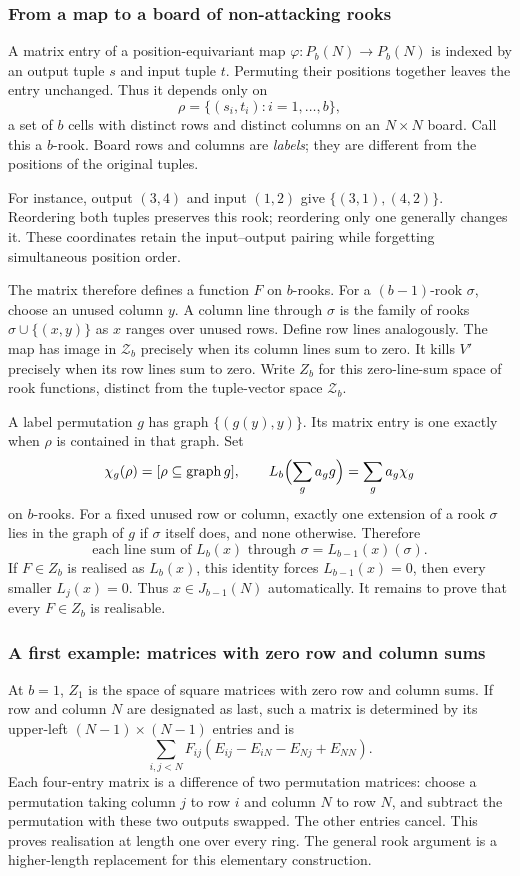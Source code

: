 \documentclass[11pt,a4paper]{article}
\theoremstyle{definition}\newtheorem{definition}[theorem]{Definition}
\theoremstyle{remark}\newtheorem{remark}[theorem]{Remark}
\begin{document}
\subsubsection{From a map to a board of non-attacking rooks}
A matrix entry of a position-equivariant map $\varphi:P_b(N)\to P_b(N)$ is indexed by an output tuple $s$ and input tuple $t$. Permuting their positions together leaves the entry unchanged. Thus it depends only on
\[\rho=\{(s_i,t_i):i=1,\ldots,b\},
\]
a set of $b$ cells with distinct rows and distinct columns on an $N\times N$ board. Call this a $b$-rook. Board rows and columns are \emph{labels}; they are different from the positions of the original tuples.

For instance, output $(3,4)$ and input $(1,2)$ give
$\{(3,1),(4,2)\}$. Reordering both tuples preserves this rook;
reordering only one generally changes it. These coordinates retain
the input--output pairing while forgetting simultaneous position order.

The matrix therefore defines a function $F$ on $b$-rooks. For a $(b-1)$-rook $\sigma$, choose an unused column $y$. A column line through $\sigma$ is the family of rooks $\sigma\cup\{(x,y)\}$ as $x$ ranges over unused rows. Define row lines analogously. The map has image in $\mathcal Z_b$ precisely when its column lines sum to zero. It kills $V'$ precisely when its row lines sum to zero. Write $Z_b$ for this zero-line-sum space of rook functions, distinct from the tuple-vector space $\mathcal Z_b$.

A label permutation $g$ has graph $\{(g(y),y)\}$. Its matrix entry is one exactly when $\rho$ is contained in that graph. Set
\[\chi_g(\rho)=[\rho\subseteq\operatorname{graph}g],\qquad
L_b\Bigl(\sum_ga_gg\Bigr)=\sum_ga_g\chi_g
\]
on $b$-rooks. For a fixed unused row or column, exactly one extension of a rook $\sigma$ lies in the graph of $g$ if $\sigma$ itself does, and none otherwise. Therefore
\begin{equation}\label{eq:lines}
\text{each line sum of }L_b(x)\text{ through }\sigma=L_{b-1}(x)(\sigma).
\end{equation}
If $F\in Z_b$ is realised as $L_b(x)$, this identity forces $L_{b-1}(x)=0$, then every smaller $L_j(x)=0$. Thus $x\in J_{b-1}(N)$ automatically. It remains to prove that every $F\in Z_b$ is realisable.

\subsubsection{A first example: matrices with zero row and column sums}
At $b=1$, $Z_1$ is the space of square matrices with zero row and column sums. If row and column $N$ are designated as last, such a matrix is determined by its upper-left $(N-1)\times(N-1)$ entries and is
\[\sum_{i,j<N}F_{ij}(E_{ij}-E_{iN}-E_{Nj}+E_{NN}).
\]
Each four-entry matrix is a difference of two permutation matrices: choose a permutation taking column $j$ to row $i$ and column $N$ to row $N$, and subtract the permutation with these two outputs swapped. The other entries cancel. This proves realisation at length one over every ring. The general rook argument is a higher-length replacement for this elementary construction.
\end{document}
